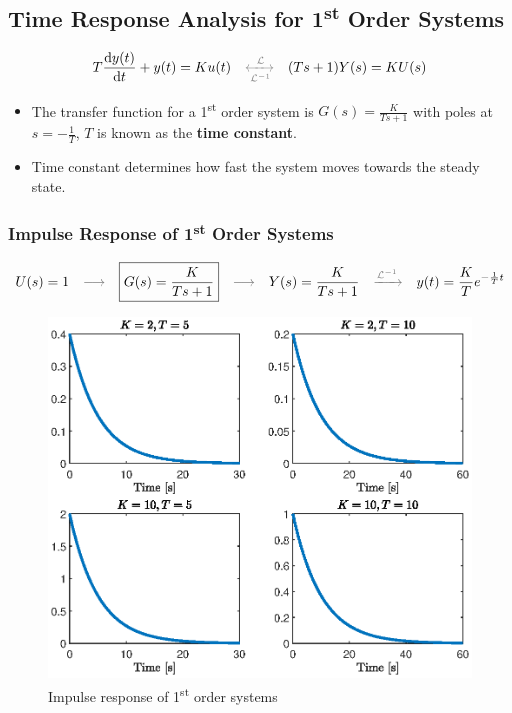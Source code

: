 \subsection{Time Response Analysis for 1\textsuperscript{st} Order Systems}
\[
T\frac{\mathrm{d}y(t)}{\mathrm{d}t}+y(t)=Ku(t) 
\quad {\color{gray}\xleftrightarrow[\mathcal{L}^{-1}]{\mathcal{L}}} \quad  
(Ts+1)Y(s)=KU(s)
\]
\begin{itemize}
    \item The transfer function for a 1\textsuperscript{st} order system is $G(s)=\frac{K}{Ts+1}$ with poles at $s=-\frac{1}{T}$,  $T$ is known as the \textbf{time constant}. 
    \item Time constant determines how fast the system moves towards the steady state.
\end{itemize}

\subsubsection{Impulse Response of 1\textsuperscript{st} Order Systems}
\[
U(s)=1 
\quad {\color{gray}\longrightarrow} \quad 
\boxed{G(s)=\frac{K}{Ts+1}}
\quad {\color{gray}\longrightarrow} \quad 
Y(s)= \frac{K}{Ts+1} 
\quad {\color{gray}\xrightarrow[]{\mathcal{L}^{-1}}} \quad 
y(t) = \frac{K}{T}e^{-\frac{1}{T}t}
\]

\begin{figure}[H] 
    \centering 
    \includegraphics[width=.8\textwidth]{images/impulse_response.eps}
    \caption{Impulse response of 1\textsuperscript{st} order systems}
\end{figure}

